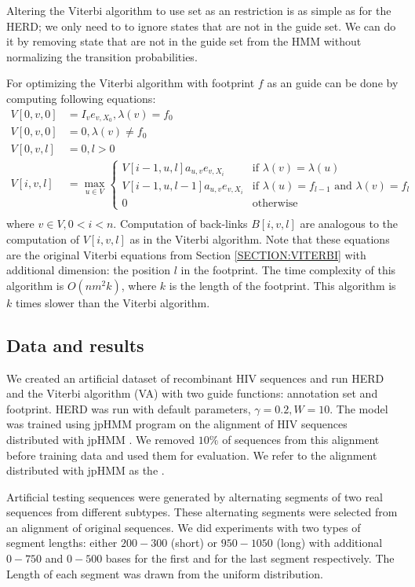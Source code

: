 Altering the Viterbi algorithm to use set as an restriction is as simple as for
the HERD; we only need to to ignore states that are not in the guide set. We
can do it by removing state that are not in the guide set from the HMM without
normalizing the transition probabilities. 

For optimizing the Viterbi algorithm with footprint $f$ as an guide can be done
by computing following equations:
\begin{align}
V[0,v, 0] &= I_{v}e_{v,X_0}, \lambda(v) = f_0\\
V[0,v, 0] &= 0, \lambda(v) \not= f_0\\
V[0,v, l] &= 0, l>0  \\
V[i,v, l] &= \max_{u\in V}\begin{cases}
V[i-1,u, l]a_{u,v}e_{v,X_i}& 
\text{if $\lambda(v) =\lambda(u)$}\\
V[i-1,u, l - 1]a_{u,v}e_{v,X_i} &
\text{if $\lambda(u) = f_{l-1}$ and $\lambda(v) = f_{l}$}\\
0 & \text{otherwise}
\end{cases}\\
\end{align}
where $v\in V,0<i<n$. Computation of back-links $B[i, v, l]$ are analogous to
the computation of $V[i, v, l]$ as in the Viterbi algorithm. Note that these
equations are the original Viterbi equations from Section \ref{SECTION:VITERBI}
with additional dimension: the position $l$ in the footprint. The time
complexity of this algorithm is $O(nm^2k)$, where $k$ is the length of the
footprint. This algorithm is $k$ times slower than the Viterbi algorithm.

\subsection{Data and results}
We created an artificial dataset of recombinant HIV sequences and run HERD and
the Viterbi algorithm (VA) with two guide functions: annotation set and
footprint. HERD was run with default parameters, $\gamma=0.2, W=10$. The model
was trained using jpHMM program on the alignment of HIV sequences distributed
with jpHMM \cite{Schultz2006}. We removed $10\%$ of sequences from this
alignment before training data and used them for evaluation. We refer to the
alignment distributed with jpHMM as the .

Artificial testing sequences were generated by alternating segments of two real
sequences from different subtypes.  These alternating segments were selected
from an alignment of original sequences. We did experiments with two types of
segment lengths: either $200-300$ (short) or $950-1050$ (long) with additional
$0-750$ and $0-500$ bases for the first and for the last segment respectively.
The Length of each segment was drawn from the uniform distribution.

